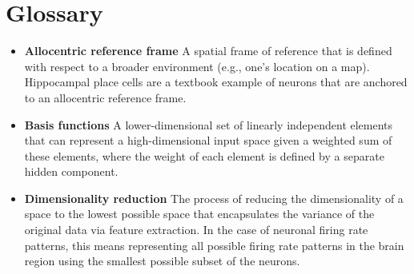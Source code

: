 
\section*{Glossary}
\label{sec:Glossary}

\begin{itemize}
\item \textbf{Allocentric reference frame}  A spatial frame of reference that is defined with respect to a broader environment (e.g., one's location on a map). Hippocampal place cells are a textbook example of neurons that are anchored to an allocentric reference frame.

\item \textbf{Basis functions}  A lower-dimensional set of linearly independent elements that can represent a high-dimensional input space given a weighted sum of these elements, where the weight of each element is defined by a separate hidden component.



\item \textbf{Dimensionality reduction} The process of reducing the dimensionality of a space to the lowest possible space that encapsulates the variance of the original data via feature extraction. In the case of neuronal firing rate patterns, this means representing all possible firing rate patterns in the brain region using the smallest possible subset of the neurons.


\end{itemize}

